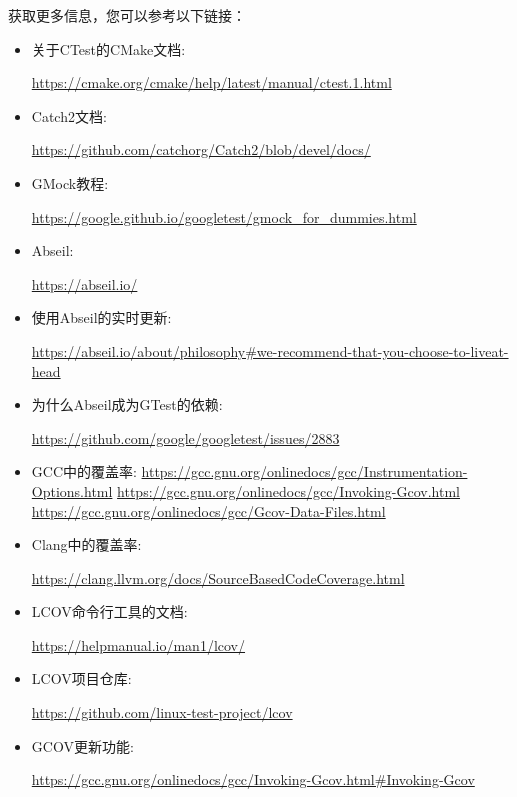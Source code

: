获取更多信息，您可以参考以下链接：

\begin{itemize}
\item
关于CTest的CMake文档:

\url{https://cmake.org/cmake/help/latest/manual/ctest.1.html}

\item
Catch2文档:

\url{https://github.com/catchorg/Catch2/blob/devel/docs/}

\item
GMock教程:

\url{https://google.github.io/googletest/gmock_for_dummies.html}

\item
Abseil:

\url{https://abseil.io/}

\item
使用Abseil的实时更新:

\url{https://abseil.io/about/philosophy#we-recommend-that-you-choose-to-liveat-head}

\item
为什么Abseil成为GTest的依赖:

\url{https://github.com/google/googletest/issues/2883}

\item
GCC中的覆盖率:
\url{https://gcc.gnu.org/onlinedocs/gcc/Instrumentation-Options.html}
\url{https://gcc.gnu.org/onlinedocs/gcc/Invoking-Gcov.html}
\url{https://gcc.gnu.org/onlinedocs/gcc/Gcov-Data-Files.html}

\item
Clang中的覆盖率:

\url{https://clang.llvm.org/docs/SourceBasedCodeCoverage.html}

\item
LCOV命令行工具的文档:

\url{https://helpmanual.io/man1/lcov/}

\item
LCOV项目仓库:

\url{https://github.com/linux-test-project/lcov}

\item
GCOV更新功能:

\url{https://gcc.gnu.org/onlinedocs/gcc/Invoking-Gcov.html#Invoking-Gcov}
\end{itemize}













